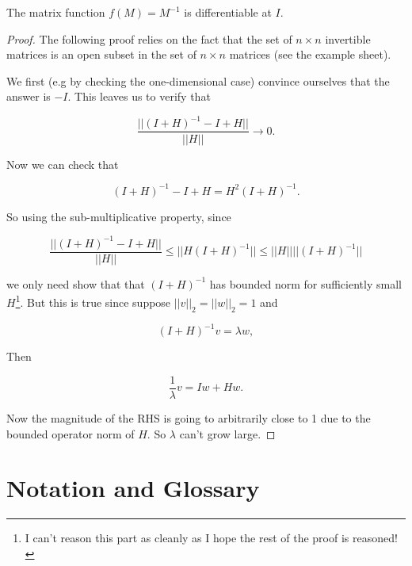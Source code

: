 \documentclass[11pt]{scrartcl}
\begin{document}
\begin{example}
[2019 P1L]

The matrix function $f(M) = M^{-1}$ is differentiable at $I$.

\begin{proof}

    The following proof relies on the fact that the set of $n \times n$ invertible matrices is an open subset in the set of $n \times n$ matrices (see the example sheet).

    We first (e.g by checking the one-dimensional case) convince ourselves that the answer is $-I$. This leaves us to verify that

    \begin{equation}
        \frac{ || (I+H)^{-1} - I + H|| }{|| H ||} \to 0.
    \end{equation}

    Now we can check that 

    \begin{equation}
        (I+H)^{-1} - I + H = H^2 (I + H)^{-1}.
    \end{equation}

    So using the sub-multiplicative property, since 
    
    \begin{equation}
        \frac{ || (I+H)^{-1} - I + H|| }{|| H ||} \le ||H (I+H)^{-1}|| \le ||H|| ||(I+H)^{-1}||
    \end{equation}

    we only need show that that $(I+H)^{-1}$ has bounded norm for sufficiently small $H$\footnote{I can't reason this part as cleanly as I hope the rest of the proof is reasoned!}. But this is true since suppose $||v||_2 = ||w||_2 = 1$ and 

    \begin{equation}
        (I+H)^{-1} v = \lambda w,
    \end{equation}

    Then

    \begin{equation}
        \frac{1}{\lambda} v = Iw + Hw.
    \end{equation}

    Now the magnitude of the RHS is going to arbitrarily close to 1 due to the bounded operator norm of $H$. So $\lambda$ can't grow large.
\end{proof}
\end{example}

\section{Notation and Glossary}
\end{document}
